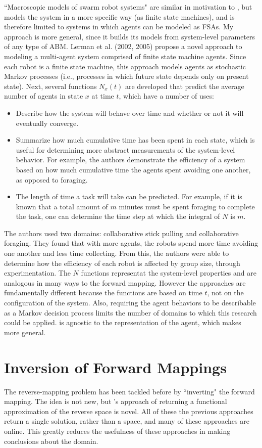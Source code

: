 ``Macroscopic models of swarm robot systems" \cite{lerman2002mmf,lerman2005rpm} are similar in motivation to \fw, but models the system in a more specific way (as finite state machines), and is therefore limited to systems in which agents can be modeled as FSAs.
My approach is more general, since it builds its models from system-level parameters of any type of ABM.
Lerman et al. (2002, 2005) propose a novel approach to modeling a multi-agent system comprised of finite state machine agents.
Since each robot is a finite state machine, this approach models agents as stochastic Markov processes (i.e., processes in which future state depends only on present state).
Next, several functions $N_x(t)$ are developed that predict the average number of agents in state $x$ at time $t$, which have a number of uses:
\begin{itemize}
\item Describe how the system will behave over time and whether or not it will eventually converge.
\item Summarize how much cumulative time has been spent in each state, which is useful for determining more abstract measurements of the system-level behavior. For example, the authors demonstrate the efficiency of a system based on how much cumulative time the agents spent avoiding one another, as opposed to foraging.
\item The length of time a task will take can be predicted. For example, if it is known that a total amount of $m$ minutes must be spent foraging to complete the task, one can determine the time step at which the integral of $N$ is $m$.
\end{itemize}
The authors used two domains: collaborative stick pulling and collaborative foraging.
They found that with more agents, the robots spend more time avoiding one another and less time collecting.
From this, the authors were able to determine how the efficiency of each robot is affected by group size, through experimentation.
The $N$ functions representat the system-level properties and are analogous in many ways to the \fw forward mapping.
However the approaches are fundamentally different because the functions are based on time $t$, not on the configuration of the system.
Also, requiring the agent behaviors to be describable as a Markov decision process limits the number of domains to which this research could be applied.
\fw is agnostic to the representation of the agent, which makes \fw more general.


\section{Inversion of Forward Mappings}
\label{sec:invfm}
The reverse-mapping problem has been tackled before by ``inverting" the forward mapping.
The idea is not new, but  \fw's approach of returning a functional approximation of the reverse space is novel.
All of these the previous approaches return a single solution, rather than a space, and many of these approaches are online.
This greatly reduces the usefulness of these approaches in making conclusions about the domain.

